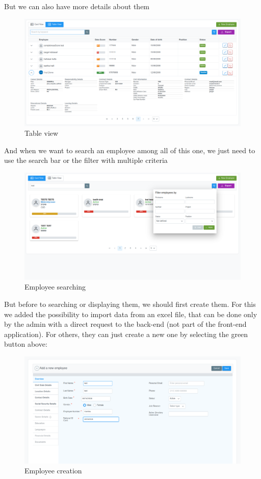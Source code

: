 \documentclass[12pt,a4paper,table,english]{article}
\begin{document}
	But we can also have more details about them
	\begin{figure}[H]
		\centering
		\includegraphics[width=150mm]{Image/tableview}
		\caption{Table view}
		\label{fig:Table view}
	\end{figure}
		
	And when we want to search an employee among all of this one, we just need to use the search bar or the filter with multiple criteria
	\begin{figure}[H]
		\centering
		\includegraphics[width=150mm]{Image/search}
		\caption{Employee searching}
		\label{fig:Employee searching}
	\end{figure}

	But before to searching or displaying them, we should first create them.
	For this we added the possibility to import data from an excel file, that can be done only by the admin with a direct request to the back-end (not part of the front-end application). For others, they can just create a new one by selecting the green button above:

	\begin{figure}[H]
	\centering
	\includegraphics[width=150mm]{Image/employeeadd}
	\caption{Employee creation}
	\label{fig:Employee creation}
	\end{figure}
	
\end{document}
